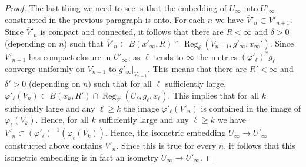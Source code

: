 \begin{proof}
The last thing we need to see is that the embedding of $U_\infty$ into
$U'_\infty$ constructed in the previous paragraph is onto. For each $n$ we have
$\overline V'_n\subset V'_{n+1}$. Since $\overline V'_n$ is compact and
connected, it follows that there are $R<\infty$ and $\delta>0$ (depending on
$n$) such that $\overline V'_n\subset B(x'_\infty,R)\cap \operatorname{Reg}_\delta(V_{n+1},g'_\infty,x_\infty')$. Since $V'_{n+1}$ has compact closure
in $U'_\infty$, as $\ell$ tends to $\infty$ the metrics
$(\varphi'_\ell)^*g_\ell$ converge uniformly on $V_{n+1}$ to
$g'_\infty|_{V_{n+1}}$. This means that there are $R'<\infty$ and $\delta'>0$
(depending on $n)$ such that for all $\ell$ sufficiently large,
$\varphi'_\ell(V_n)\subset B(x_k,R')\cap \operatorname{Reg}_{\delta'}(U_\ell,g_\ell,x_\ell)$. This implies that for all $k$
sufficiently large and any $\ell\ge k$ the image $\varphi'_\ell(V'_n)$ is
contained in the image of $\varphi_\ell(V_k)$. Hence, for all $k$  sufficiently
large and any $\ell\ge k$ we have
$V'_n\subset(\varphi'_\ell)^{-1}(\varphi_\ell(V_k))$. Hence, the isometric
embedding $U_\infty\to U'_\infty$ constructed above contains $V'_n$. Since this
is true for every $n$, it follows that this isometric embedding is in fact an
isometry $U_\infty\to U'_\infty$.
\end{proof}









